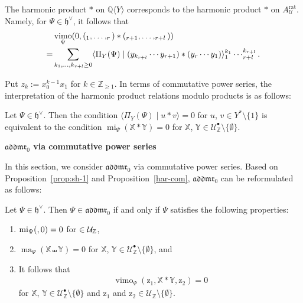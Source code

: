 \documentclass[15pt,oneside,reqno]{amsart}
\theoremstyle{remark}{
\newtheorem{lem}[df]{Lemma}
\newtheorem{prop}[df]{Proposition}
\newtheorem{ex}[df]{Example}
\newtheorem{rmk}[df]{Remark}
}
\newcommand{\ide}[1]{\mathfrak{#1}}
\newcommand{\Z}{\mathbb{Z}}
\newcommand{\Q}{\mathbb{Q}}
\newcommand{\ls}{\mathfrak{ls}}
\newcommand{\addmr}{\mathfrak{addmr}}
\newcommand{\adls}{\mathfrak{adls}}
\DeclareMathOperator{\mi}{mi}
\DeclareMathOperator{\ma}{ma}
\DeclareMathOperator{\vimo}{vimo}
\let\x\relax
\newcommand{\x}{\mathrm{x}}
\newcommand{\z}{\mathrm{z}}
\let\v\relax
\newcommand{\v}{\mathrm{v}}
\newcommand{\nsubsection}[1]{%
  \par\bigskip
  \noindent\textbf{#1}\par
  \medskip
}
\begin{document}
\begin{rmk}
The harmonic product $*$ on $\Q\langle Y\rangle$ corresponds to the harmonic product $*$ on $A_{\mathcal{U}}^{\mathrm{rat}}$.
Namely, for $\Psi \in \ide{h}^{\vee}$, it follows that
\begin{align*}
&\vimo_{\Psi}(0,(\x_1,\ldots,\x_r) * (\x_{r+1},\ldots,\x_{r+l}))\\
=&\sum_{k_1,\ldots,k_{r+l}\ge 0} \langle \Pi_Y(\Psi) \mid (y_{k_{r+l}}\cdots y_{r+1}) * (y_{r} \cdots y_1)\rangle \x_1^{k_1}\cdots \x_{r+l}^{k_{r+l}}.
\end{align*} 
\end{rmk}


Put $z_k := x_0^{k-1}x_1$ for $k\in\mathbb{Z}_{\ge 1}$.
In terms of commutative power series, the interpretation of the harmonic product relations modulo products is as follows:

\begin{prop}\label{har-com}
Let $\Psi \in \ide{h}^{\vee}$. Then the condition $\langle \Pi_Y(\Psi) \mid u * v \rangle = 0$ for $u$, $v \in Y^*\setminus\{1\}$ is equivalent to the condition $\mi_{\Psi} (\mathbb{X} * \mathbb{Y}) = 0$ for $\mathbb{X}$, $\mathbb{Y} \in \mathcal{U}_{\Z}^{\bullet}\setminus\{\emptyset\}$.
\end{prop}










\nsubsection{ $\addmr_0$ via commutative power series}



In this section, we consider $\addmr_0$ via commutative power series. %
Based on Proposition~\ref{prop:sh-1} and Proposition~\ref{har-com}, $\addmr_0$ can be reformulated as follows:

\begin{prop}\label{prop:addmr-mould}
Let $\Psi \in  \ide{h}^{\vee}$. Then $\Psi \in \addmr_0$ if and only if $\Psi$ satisfies the following properties:
\begin{enumerate}
\item\label{enumi:ad--1} $\mi_{\Psi}(\v,0) = 0$ for $\v \in \mathcal{U}_{\Z}$,
\item\label{enumi:ad--2} $\ma_{\Psi}(\mathbb{X} \shuffle \mathbb{Y}) = 0$ for $\mathbb{X}$, $\mathbb{Y} \in \mathcal{U}_{\Z}^{\bullet}\setminus\{\emptyset\}$, and
\item\label{enumi:ad--3} It follows that 
\begin{align}
\vimo_{\Psi}(\z_1, \mathbb{X} * \mathbb{Y} , \z_2) = 0 \label{eq:adjoint-harmonic}
\end{align}
for $\mathbb{X}$, $\mathbb{Y} \in \mathcal{U}_{\Z}^{\bullet}\setminus\{\emptyset\}$ and $\z_1$ and $\z_2 \in \mathcal{U}_{\Z}\setminus\{\emptyset\}$.
\end{enumerate}
\end{prop}
\end{document}
